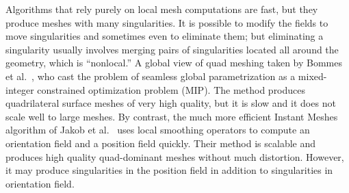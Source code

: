Algorithms that rely purely on local mesh computations are fast, but they produce meshes with many singularities. It is possible to modify the fields to move singularities and sometimes even to eliminate them; but eliminating a singularity
usually involves merging pairs of singularities located all around the geometry, which is ``nonlocal.'' 
A global view of quad meshing taken by Bommes et al.~\cite{bommes2009mixed}, who cast the problem of seamless global parametrization as a mixed-integer constrained optimization problem (MIP).
The method produces quadrilateral surface meshes of very high quality, but it is slow and it does not scale well to large meshes. By contrast, the much more efficient Instant Meshes algorithm of Jakob et al.~\cite{jakob2015instant} uses local smoothing operators to compute an orientation field and a position field quickly. Their method is scalable and produces high quality quad-dominant meshes without much distortion. However, it may produce singularities in the position field in addition to singularities in orientation field.

